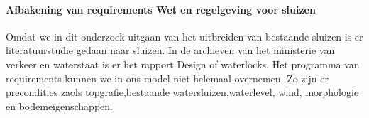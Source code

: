 \documentclass{article}
\begin{document}
	\paragraph{Afbakening van requirements Wet en regelgeving voor sluizen}
	Omdat we in dit onderzoek uitgaan van het uitbreiden van bestaande sluizen is er literatuurstudie gedaan naar sluizen. In de archieven van het ministerie van verkeer en waterstaat is er het rapport Design of waterlocks\cite{CivilEngineeringDivision}.
	Het programma van requirements kunnen we in ons model niet helemaal overnemen. 
	Zo zijn er precondities zaols topgrafie,bestaande watersluizen,waterlevel, wind, morphologie en bodemeigenschappen.
	
\end{document}
